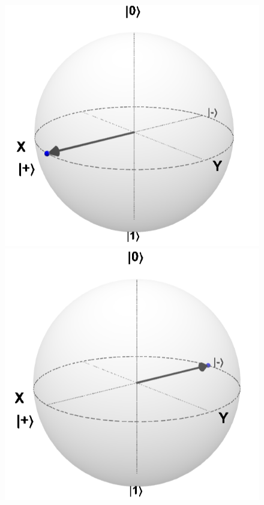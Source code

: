 \documentclass{beamer}
\begin{document}
\begin{frame}
\pause
\begin{figure}
\includegraphics[scale=0.35]{ket+}\pause\quad
\includegraphics[scale=0.35]{ket-}
\end{figure}
\end{frame}
\end{document}
